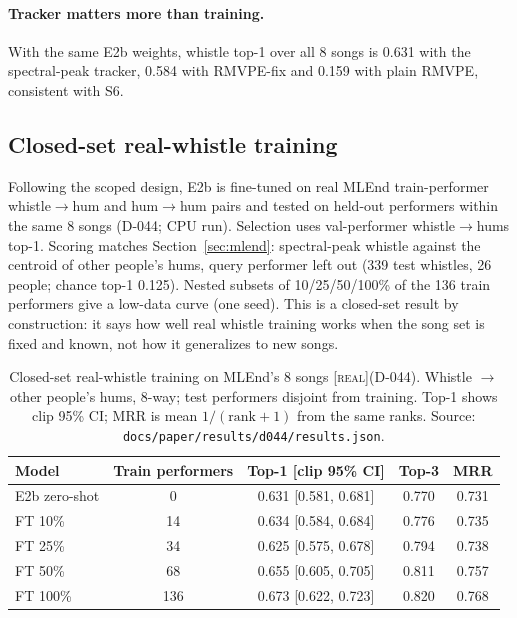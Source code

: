 \documentclass[11pt]{article}
\newcommand{\real}{\textsc{[real]}}
\newif\ifclosedsetpending
\begin{document}
\paragraph{Tracker matters more than training.} With the same E2b weights, whistle top-1 over all 8 songs is 0.631 with the spectral-peak tracker, 0.584 with RMVPE-fix and 0.159 with plain RMVPE, consistent with S6.

\subsection{Closed-set real-whistle training}\label{sec:closedset}

Following the scoped design, E2b is fine-tuned on real MLEnd train-performer whistle$\to$hum and hum$\to$hum pairs and tested on held-out performers within the same 8 songs (D-044; CPU run). Selection uses val-performer whistle$\to$hums top-1. Scoring matches Section~\ref{sec:mlend}: spectral-peak whistle against the centroid of other people's hums, query performer left out (339 test whistles, 26 people; chance top-1 0.125). Nested subsets of 10/25/50/100\% of the 136 train performers give a low-data curve (one seed). This is a closed-set result by construction: it says how well real whistle training works when the song set is fixed and known, not how it generalizes to new songs.

\ifclosedsetpending
\begin{center}
\fbox{\parbox{0.9\linewidth}{\centering\textbf{Pending.} Results from the closed-set real-whistle training run will be added to Table~\ref{tab:closedset}.}}
\end{center}
\fi

\begin{table}[t]
\centering
\caption{Closed-set real-whistle training on MLEnd's 8 songs \real (D-044). Whistle $\to$ other people's hums, 8-way; test performers disjoint from training. Top-1 shows clip 95\% CI; MRR is mean $1/(\mathrm{rank}+1)$ from the same ranks. Source: \texttt{docs/paper/results/d044/results.json}.}
\label{tab:closedset}
\small
\setlength{\tabcolsep}{4pt}
\begin{tabular}{lcccc}
\toprule
Model & Train performers & Top-1 [clip 95\% CI] & Top-3 & MRR \\
\midrule
E2b zero-shot & 0 & 0.631 [0.581, 0.681] & 0.770 & 0.731 \\
FT 10\% & 14 & 0.634 [0.584, 0.684] & 0.776 & 0.735 \\
FT 25\% & 34 & 0.625 [0.575, 0.678] & 0.794 & 0.738 \\
FT 50\% & 68 & 0.655 [0.605, 0.705] & 0.811 & 0.757 \\
FT 100\% & 136 & 0.673 [0.622, 0.723] & 0.820 & 0.768 \\
\bottomrule
\end{tabular}
\end{table}
\end{document}

